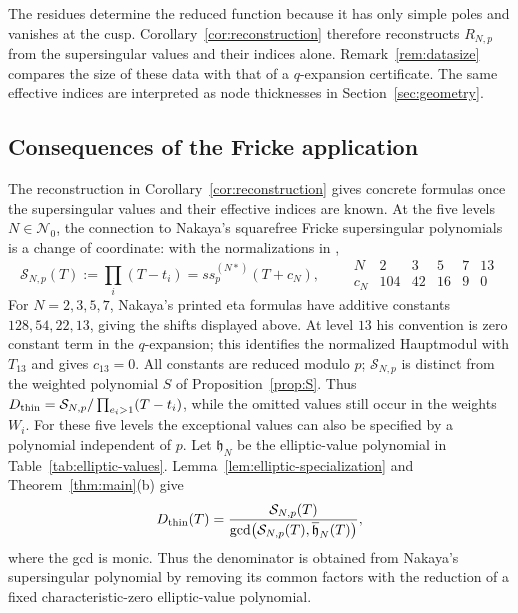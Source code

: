 \documentclass[11pt,a4paper]{article}
\numberwithin{equation}{section}
\theoremstyle{definition}
\theoremstyle{remark}
\begin{document}
The residues determine the reduced function because it has only simple
poles and vanishes at the cusp. Corollary~\ref{cor:reconstruction}
therefore reconstructs $R_{N,p}$ from the supersingular values and their
indices alone. Remark~\ref{rem:datasize} compares the size of these data
with that of a $q$-expansion certificate.
The same effective indices are interpreted as node thicknesses in
Section~\ref{sec:geometry}.

\subsection{Consequences of the Fricke application}\label{subsec:consequences}
The reconstruction in Corollary~\ref{cor:reconstruction} gives concrete formulas
once the supersingular values and their effective indices are known.
At the five levels $N\in\mathcal N_0$, the connection to Nakaya's
squarefree Fricke supersingular polynomials is a change of coordinate:
with the normalizations in \citet[\S4]{Nakaya19},
\begin{equation}\label{eq:nakaya-coordinate}
\mathcal S_{N,p}(T):=\prod_i(T-t_i)=ss_p^{(N*)}(T+c_N),\qquad
\begin{array}{c|rrrrr}
N&2&3&5&7&13\\\hline
c_N&104&42&16&9&0
\end{array}
\end{equation}
For $N=2,3,5,7$, Nakaya's printed eta formulas have additive
constants $128,54,22,13$, giving the shifts displayed above. At level
$13$ his convention is zero constant term in the $q$-expansion; this
identifies the normalized Hauptmodul with $T_{13}$ and gives $c_{13}=0$.
All constants are reduced modulo $p$; $\mathcal S_{N,p}$ is distinct from the
weighted polynomial $S$ of Proposition~\ref{prop:S}. Thus
$D_{\rm thin}=\mathcal S_{N,p}/\prod_{e_i>1}(T-t_i)$, while the omitted
values still occur in the weights $W_i$.
For these five levels the exceptional values can also be specified
by a polynomial independent of $p$.
Let $\mathfrak h_N$ be the elliptic-value polynomial in Table~\ref{tab:elliptic-values}.
Lemma~\ref{lem:elliptic-specialization} and Theorem~\ref{thm:main}(b) give
\begin{equation}\label{eq:elliptic-gcd}
D_{\rm thin}(T)=\frac{\mathcal S_{N,p}(T)}
{\gcd\bigl(\mathcal S_{N,p}(T),\overline{\mathfrak h}_N(T)\bigr)},
\end{equation}
where the gcd is monic. Thus the denominator is obtained from Nakaya's
supersingular polynomial by removing its common factors with the reduction
of a fixed characteristic-zero elliptic-value polynomial.
\end{document}
